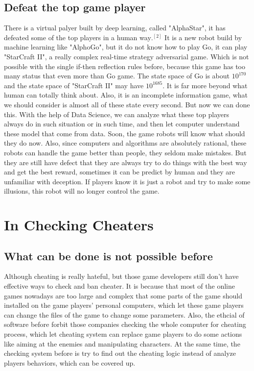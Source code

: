 \documentclass[12pt]{article}
\begin{document}
        \subsection{Defeat the top game player}
            There is a virtual palyer built by deep learning, called "AlphaStar", it
            has defeated some of the top players in a human way$.^{[2]}$ It is a new robot build by machine
            learning like "AlphoGo", but it do not know how to play Go, it can play
            "StarCraft II", a really complex real-time strategy adversarial game. Which is not
            possible with the single if-then reflection rules before, because this game has too
            many status that even more than Go game. The state space of Go is about $10^{170}$ and
            the state space of "StarCraft II" may have $10^{1685}$. It is far more beyond what
            human can totally think about. Also, it is an incomplete information game, what we should
            consider is almost all of these state every second. But now we can done this. With the help
            of Data Science, we can analyze what these top players always do in such situation or in
            such time, and then let computer understand these model that come from data. Soon, the
            game robots will know what should they do now. Also, since computers and algorithms are
            absolutely rational, these robots can handle the game better than people, they seldom
            make mistakes. But they are still have defect that they are always try to do things
            with the best way and get the best reward, sometimes it can be predict by human and they
            are unfamiliar with deception. If players know it is just a robot and try to make some
            illusions, this robot will no longer control the game.
    \section{In Checking Cheaters}
        \subsection{What can be done is not possible before}
            Although cheating is really hateful, but those game developers still don't have effective
            ways to check and ban cheater. It is because that most of the online games nowadays are too large and complex that some parts
            of the game should installed on the game players' personal computers, which let these game
            players can change the files of the game to change some parameters. Also, the ethcial of
            software before forbit those companies checking the whole computer for cheating process,
            which let cheating system can replace game players to do some actions like aiming at the
            enemies and manipulating characters. At the same time, the checking system before is try
            to find out the cheating logic instead of analyze players behaviors, which can be covered
            up.
\end{document}
